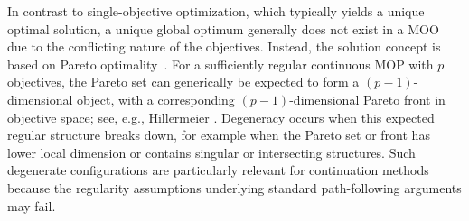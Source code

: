 \documentclass[11pt,pdflatex,sn-mathphys-ay]{sn-jnl}%
\theoremstyle{definition}
\theoremstyle{thmstyleone}%
\theoremstyle{thmstyletwo}%
\theoremstyle{thmstylethree}%
\newcommand{\add}[1]{\textcolor{revisionblue}{#1}}
\begin{document}
	In contrast to single-objective optimization, which typically yields a unique optimal solution,  a unique global optimum generally does not exist in a MOO due to the conflicting nature of the objectives. Instead, the solution concept is based on Pareto optimality~\cite{pareto1964cours, miettinen1999nonlinear}. \add{ For a sufficiently regular continuous MOP with $p$ objectives, the Pareto set can generically be expected to form a
		$(p-1)$-dimensional object, with a corresponding $(p-1)$-dimensional
		Pareto front in objective space; see, e.g., Hillermeier
		\cite{hillermeier2012nonlinear}. Degeneracy occurs when this expected regular
		structure breaks down, for example when the Pareto set or front has
		lower local dimension or contains singular or intersecting
		structures. Such degenerate configurations are particularly relevant
		for continuation methods because the regularity assumptions underlying
		standard path-following arguments may fail.}
	
\end{document}
